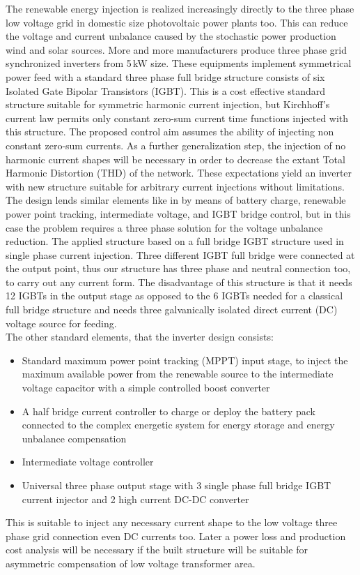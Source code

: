 %
        The renewable energy injection is realized increasingly directly to the three phase low voltage grid in domestic size photovoltaic power plants too. This can reduce the voltage and current unbalance caused by the stochastic power production wind and solar sources. More and more manufacturers produce three phase grid synchronized inverters from 5\,kW size. These equipments implement symmetrical power feed with a standard three phase full bridge structure consists of six Isolated Gate Bipolar Transistors (IGBT). This is a cost effective standard structure suitable for symmetric harmonic current injection, but Kirchhoff's current law permits only constant zero-sum current time functions injected with this structure. The proposed control aim assumes the ability of injecting non constant zero-sum currents. As a further generalization step, the injection of no harmonic current shapes will be necessary in order to decrease the extant Total Harmonic Distortion (THD) of the network. These expectations yield an inverter with new structure suitable for arbitrary current injections without limitations. The design lends similar elements like in \cite{gorbe2012reduction} by means of battery charge, renewable power point tracking, intermediate voltage, and IGBT bridge control, but in this case the problem requires a three phase solution for the voltage unbalance reduction. The applied structure based on a full bridge IGBT structure used in single phase current injection. Three different IGBT full bridge were connected at the output point, thus our structure has three phase and neutral connection too, to carry out any current form. The disadvantage of this structure is that it needs 12 IGBTs in the output stage as opposed to the 6 IGBTs needed for a classical full bridge structure and needs three galvanically isolated direct current (DC) voltage source for feeding. \\
        The other standard elements, that the inverter design consists:
        \begin{itemize}
            \item Standard maximum power point tracking (MPPT) input stage, to inject the maximum available power from the renewable source to the intermediate voltage capacitor with a simple controlled boost converter
            \item A half bridge current controller to charge or deploy the battery pack connected to the complex energetic system for energy storage and energy unbalance compensation
            \item Intermediate voltage controller
            \item Universal three phase output stage with 3 single phase full bridge IGBT current injector and 2 high current DC-DC converter
        \end{itemize}
        This is suitable to inject any necessary current shape to the low voltage three phase grid connection even DC currents too. Later a power loss and production cost analysis will be necessary if the built structure will be suitable for asymmetric compensation of low voltage transformer area.

